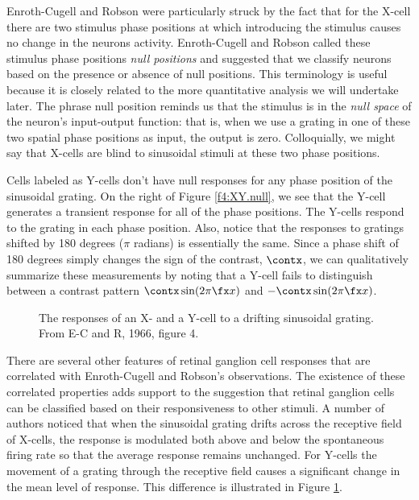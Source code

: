 Enroth-Cugell and Robson were particularly struck by
the fact that
for the X-cell there
are two stimulus phase positions at which
introducing the stimulus causes no change
in the neurons activity.
Enroth-Cugell and Robson called these stimulus phase positions
{\em null positions} and suggested that we classify
neurons based on the presence or absence of null positions.
This terminology is useful because it is closely related to 
the more quantitative analysis we will undertake later.
The phrase null position reminds us that the stimulus
is in the {\em null space} of the neuron's input-output function:
that is, when we use a grating in one of these
two spatial phase positions as input,
the output is zero.
Colloquially, we might say that X-cells are blind to
sinusoidal stimuli at these two phase positions.

Cells labeled as Y-cells don't have
null responses for any phase
position of the sinusoidal grating.
On the right of Figure \ref{f4:XY.null},
we see that the Y-cell generates
a transient response
for all of the phase positions.
The Y-cells respond to the grating in each phase position.
Also, notice that the responses
to gratings shifted by 180 degrees ($\pi$ radians)
is essentially the same.
Since a phase shift of 180 degrees simply changes the
sign of the contrast, $\contx$,
we can qualitatively
summarize these measurements by noting that
a Y-cell fails to distinguish between a contrast
pattern $\contx \sin ( 2 \pi \fx x ) $ and $ - \contx \sin ( 2 \pi \fx x ) $.

\begin{figure}
\centerline {
}
\caption[X and Y responses to drifting grating]{
The responses of an X- and a Y-cell to a drifting sinusoidal grating.
From E-C and R, 1966, figure 4.
}
\label{f4:XY.drifting.grating}
\end{figure}
There are several other features of
retinal ganglion cell responses that are correlated with
Enroth-Cugell and Robson's observations.
The existence of these correlated properties
adds support to the suggestion
that retinal ganglion cells can be classified
based on their responsiveness to other stimuli.
A number of authors noticed that when the sinusoidal
grating drifts across the receptive field of X-cells,
the response is modulated both above and below the
spontaneous firing rate so that the average response
remains unchanged.
For Y-cells the movement of a grating through the
receptive field causes a significant change in
the mean level of response.
This difference is illustrated in Figure \ref{f4:XY.drifting.grating}.

